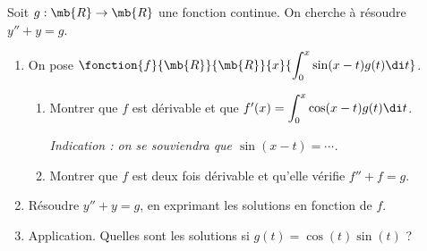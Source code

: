 
Soit $g : \mb{R} \rightarrow \mb{R}$ une fonction continue. On cherche à résoudre $y'' + y = g$.

\begin{enumerate}

\item  On pose $\fonction{f}{\mb{R}}{\mb{R}}{x}{\displaystyle \int_0^x \sin(x-t) g(t) \di t}$.

\begin{enumerate}
\item Montrer que $f$ est dérivable et que $f'(x) =  \displaystyle \int_0^x \cos(x-t) g(t) \di t$.

\emph{Indication : on se souviendra que $\sin(x-t) = \cdots$.}

\item Montrer que $f$ est deux fois dérivable et qu'elle vérifie $f'' + f = g$.


\end{enumerate}

\item Résoudre $y'' + y = g$, en exprimant les solutions en fonction de $f$.

\item Application. Quelles sont les solutions si $g(t) = \cos(t) \sin(t)$ ? 

\end{enumerate}


